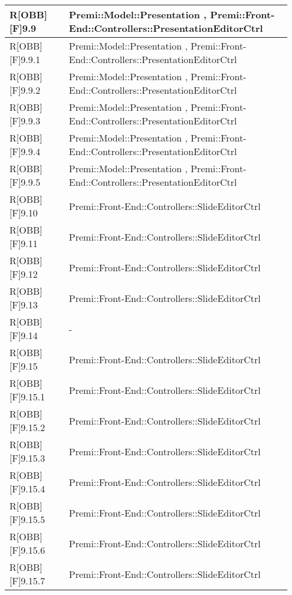 \begin{table}[h]
	\begin{center}
		\begin{tabular}{|p{0.2\linewidth}|p{0.75\linewidth}|}
			\toprule
			R[OBB][F]9.9 & Premi::Model::Presentation , Premi::Front-End::Controllers::PresentationEditorCtrl\\
		\midrule
			R[OBB][F]9.9.1 & Premi::Model::Presentation , Premi::Front-End::Controllers::PresentationEditorCtrl\\
		\midrule
			R[OBB][F]9.9.2 & Premi::Model::Presentation , Premi::Front-End::Controllers::PresentationEditorCtrl\\
		\midrule
			R[OBB][F]9.9.3 & Premi::Model::Presentation , Premi::Front-End::Controllers::PresentationEditorCtrl\\
		\midrule
			R[OBB][F]9.9.4 & Premi::Model::Presentation , Premi::Front-End::Controllers::PresentationEditorCtrl\\
		\midrule
			R[OBB][F]9.9.5 & Premi::Model::Presentation , Premi::Front-End::Controllers::PresentationEditorCtrl\\
		\midrule
			R[OBB][F]9.10 & Premi::Front-End::Controllers::SlideEditorCtrl\\
		\midrule
			R[OBB][F]9.11 & Premi::Front-End::Controllers::SlideEditorCtrl\\
		\midrule
			R[OBB][F]9.12 & Premi::Front-End::Controllers::SlideEditorCtrl\\
		\midrule
			R[OBB][F]9.13 & Premi::Front-End::Controllers::SlideEditorCtrl\\
		\midrule
			R[OBB][F]9.14 & -\\
		\midrule
			R[OBB][F]9.15 & Premi::Front-End::Controllers::SlideEditorCtrl\\
		\midrule
			R[OBB][F]9.15.1 & Premi::Front-End::Controllers::SlideEditorCtrl\\
		\midrule
			R[OBB][F]9.15.2 & Premi::Front-End::Controllers::SlideEditorCtrl\\
		\midrule
			R[OBB][F]9.15.3 & Premi::Front-End::Controllers::SlideEditorCtrl\\
		\midrule
			R[OBB][F]9.15.4 & Premi::Front-End::Controllers::SlideEditorCtrl\\
		\midrule
			R[OBB][F]9.15.5 & Premi::Front-End::Controllers::SlideEditorCtrl\\
		\midrule
			R[OBB][F]9.15.6 & Premi::Front-End::Controllers::SlideEditorCtrl\\
		\midrule
			R[OBB][F]9.15.7 & Premi::Front-End::Controllers::SlideEditorCtrl\\

\end{tabular}
\end{center}
\end{table}

